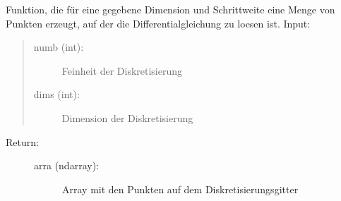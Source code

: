 \documentclass[letterpaper,10pt,ngerman]{sphinxmanual}
\begin{document}

\begin{fulllineitems}
\label{\detokenize{index:aufg_3_2u3_main.gitter}}
Funktion, die für eine gegebene Dimension und Schrittweite eine Menge von Punkten erzeugt, auf
der die Differentialgleichung zu loesen ist.
Input:
\begin{quote}
\begin{description}
\item[{numb (int):}] \leavevmode
Feinheit der Diskretisierung

\item[{dims (int):}] \leavevmode
Dimension der Diskretisierung

\end{description}
\end{quote}
\begin{description}
\item[{Return:}] \leavevmode\begin{description}
\item[{arra (ndarray):}] \leavevmode
Array mit den Punkten auf dem Diskretisierungsgitter

\end{description}

\end{description}

\end{fulllineitems}

\end{document}
